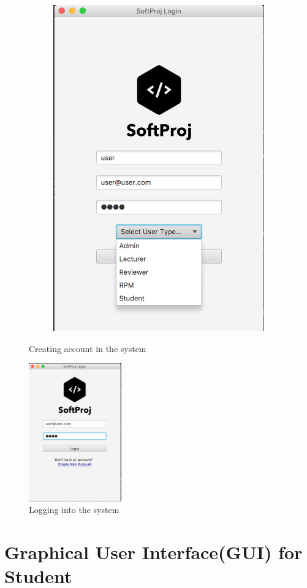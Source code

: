 \begin{figure}[h]
\begin{subfigure}{.5\textwidth}
  \includegraphics[width=.6\linewidth]{content/2.png}
  \caption{}
  \label{fig:sub2}
\end{subfigure}
\caption{Creating account in the system}
\label{fig:test}
\end{figure}


\begin{figure}[h]
\includegraphics[width=4cm]{content/3.png}
\centering
\caption{Logging into the system}
\end{figure}


\section{Graphical User Interface(GUI) for Student}


